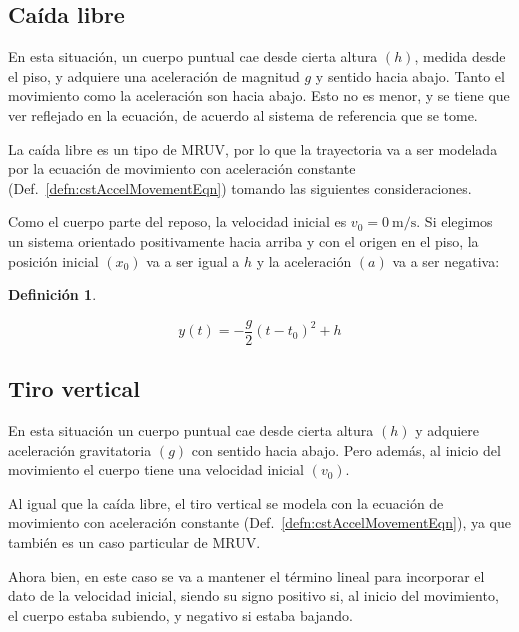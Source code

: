 \documentclass[a5paper,12pt,twoside]{book}
\newtheorem{defn}{{Definición}}[chapter]
\begin{document}
\subsection{Caída libre}

En esta situación, un cuerpo puntual cae desde cierta altura $(h)$, medida desde el piso, y adquiere una aceleración de magnitud $g$ y sentido hacia abajo.
Tanto el movimiento como la aceleración son hacia abajo.
Esto no es menor, y se tiene que ver reflejado en la ecuación, de acuerdo al sistema de referencia que se tome.

La caída libre es un tipo de MRUV, por lo que la trayectoria va a ser modelada por la ecuación de movimiento con aceleración constante (Def.\ \ref{defn:cstAccelMovementEqn}) tomando las siguientes consideraciones.

Como el cuerpo parte del reposo, la velocidad inicial es $v_0 = \SI{0}{\metre/\second}$.
Si elegimos un sistema orientado positivamente hacia arriba y con el origen en el piso, la posición inicial $\left( x_0 \right)$ va a ser igual a $h$ y la aceleración $(a)$ va a ser negativa:

\begin{mdframed}[style=MyFrame1]
    \begin{defn}
    \end{defn}
    \begin{equation*}
        y(t) = -\frac{g}{2} \left(t-t_0\right)^2 + h
    \end{equation*}
\end{mdframed}


\subsection{Tiro vertical}

En esta situación un cuerpo puntual cae desde cierta altura $(h)$ y adquiere aceleración gravitatoria $(g)$ con sentido hacia abajo.
Pero además, al inicio del movimiento el cuerpo tiene una velocidad inicial $(v_0)$.

Al igual que la caída libre, el tiro vertical se modela con la ecuación de movimiento con aceleración constante (Def.\ \ref{defn:cstAccelMovementEqn}), ya que también es un caso particular de MRUV.

Ahora bien, en este caso se va a mantener el término lineal para incorporar el dato de la velocidad inicial, siendo su signo positivo si, al inicio del movimiento, el cuerpo estaba subiendo, y negativo si estaba bajando.
\end{document}
